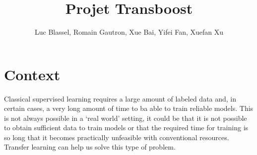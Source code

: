 \documentclass[11 pt]{article}
\title{Projet Transboost}
\author{Luc Blassel, Romain Gautron, Xue Bai, Yifei Fan, Xuefan Xu}
\begin{document}
\maketitle

\tableofcontents
\newpage

\section{Context}
\paragraph{}Classical supervised learning requires a large amount of labeled data and, in certain cases, a very long amount of time to ba able to train reliable models. This is not always possible in a `real world' setting, it could be that it is not possible to obtain sufficient data to train models or that the required time for training is so long that it becomes practically unfeasible with conventional resources. Transfer learning can help us solve this type of problem. 

\end{document}
